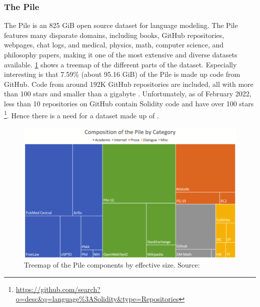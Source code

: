 \subsubsection{The Pile}
\label{sec:the-pile}
The Pile \cite{gao2021thepile} is an 825 GiB open source dataset for language modeling. The Pile features many disparate domains, including books, GitHub repositories, webpages, chat logs, and medical, physics, math, computer science, and philosophy papers, making it one of the most extensive and diverse datasets available. \cref{fig:treemap-the-pile} shows a treemap of the different parts of the dataset. Especially interesting is that 7.59\% (about 95.16 GiB) of the Pile is made up code from GitHub. Code from around 192K GitHub repositories are included, all with more than 100 stars and smaller than a gigabyte \cite{github-downloader}. Unfortunately, as of February 2022, less than 10 repositories on GitHub contain Solidity code and have over 100 stars \footnote{\url{https://github.com/search?o=desc&q=language\%3ASolidity&type=Repositories}}. Hence there is a need for a dataset made up of .

\begin{figure}[htp]
    \centering
    \includegraphics[width=\textwidth]{figures/Treemap-of-Pile-components-by-effective-size.png}
    \caption{Treemap of the Pile components by effective size. Source: \cite{gao2021thepile}}
    \label{fig:treemap-the-pile}
\end{figure}

